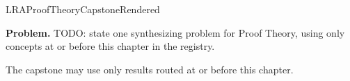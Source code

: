 \ifcsname LRAProofTheoryCapstoneRendered\endcsname
\else
\expandafter\gdef\csname LRAProofTheoryCapstoneRendered\endcsname{}

\newpage
{}
\label{cap:proof-theory}

\begin{tcolorbox}[
  colback=gray!6,
  colframe=gray!40,
  arc=2pt,
  left=8pt, right=8pt, top=6pt, bottom=6pt,
  title={\small\textbf{Capstone Problem}},
  fonttitle=\small\bfseries
]
\textbf{Problem.}
TODO: state one synthesizing problem for Proof Theory, using only concepts at or
before this chapter in the registry.
\end{tcolorbox}

\begin{remark*}
The capstone may use only results routed at or before this chapter.
\end{remark*}

\clearpage
\fi
